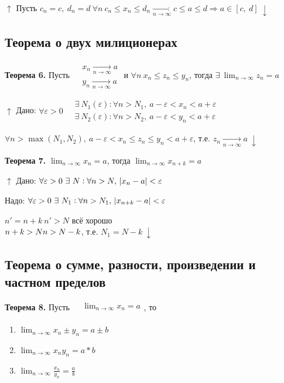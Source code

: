 \documentclass{article}
\begin{document}
    \(\uparrow\) Пусть \(c_n = c,\ d_n = d\ \forall n\ c_n \leq x_n \leq d_n \xrightarrow[n \rightarrow \infty]{} c \leq a \leq d \Rightarrow a \in [c,\ d]\ \downarrow\)
    
    \subsection{Теорема о двух милиционерах}
    
    \textbf{Теорема 6.} Пусть \(\begin{aligned}
    	&x_n \xrightarrow[n \rightarrow \infty]{} a\\
        &y_n \xrightarrow[n \rightarrow \infty]{} a
        \end{aligned}\) и \(\forall n\ x_n \leq z_n \leq y_n\), тогда \(\exists\ \lim_{n \rightarrow \infty}{z_n} = a\)
        
    \(\uparrow\) Дано: \(\forall \varepsilon > 0\ \begin{aligned}
    	&\exists\ N_1(\varepsilon) : \forall n > N_1,\ a - \varepsilon < x_n < a + \varepsilon\\
        &\exists\ N_2(\varepsilon) : \forall n > N_2,\ a - \varepsilon < y_n < a + \varepsilon
    	\end{aligned}\)
    
    \(\forall n > \max{(N_1, N_2)},\ a - \varepsilon < x_n \leq z_n \leq y_n < a + \varepsilon\), т.е. \(z_n \xrightarrow[n \rightarrow \infty]{} a\ \downarrow\)
    
    \textbf{Теорема 7.} \(\lim_{n \rightarrow \infty}{x_n} = a\), тогда \(\lim_{n \rightarrow \infty}{x_{n+k}} = a\)
    
    \(\uparrow\) Дано: \(\forall \varepsilon > 0\ \exists\ N : \forall n > N,\ \abs{x_n - a} < \varepsilon\)
    
    Надо: \(\forall \varepsilon > 0\ \exists\ N_1 : \forall n > N_1,\ \abs{x_{n+k} - a} < \varepsilon\)
    
    \(n' = n + k\ n' > N\) всё хорошо
    \\ \(n + k > N\\ n > N - k\), т.е. \(N_1 = N - k\ \downarrow\)
    
    \subsection{Теорема о сумме, разности, произведении и частном пределов}
    
    \textbf{Теорема 8.} Пусть \(\begin{aligned}
    	&\lim_{n \rightarrow \infty}{x_n} = a\\
        \end{aligned}\), то
        \begin{enumerate}
        	\item \(\lim_{n \rightarrow \infty}{x_n \pm y_n} = a \pm b\)
            \item \(\lim_{n \rightarrow \infty}{x_n y_n} = a*b\)
            \item \(\lim_{n \rightarrow \infty}{\frac{x_n}{y_n}} = \frac{a}{b}\)
        \end{enumerate}
    
\end{document}
